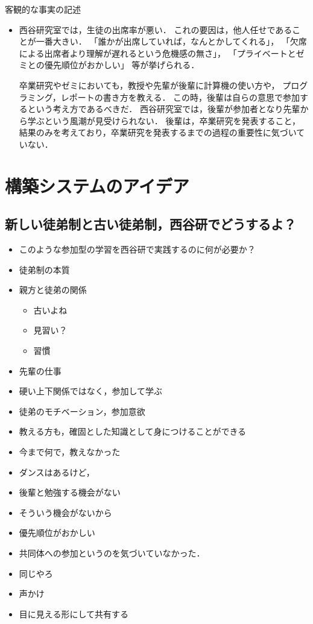 \documentclass{hissymp}
\begin{document}
客観的な事実の記述
\begin{itemize}
\item 西谷研究室では，生徒の出席率が悪い．
これの要因は，他人任せであることが一番大きい．
「誰かが出席していれば，なんとかしてくれる」，
「欠席による出席者より理解が遅れるという危機感の無さ」，
「プライベートとゼミとの優先順位がおかしい」
等が挙げられる．

卒業研究やゼミにおいても，教授や先輩が後輩に計算機の使い方や，
プログラミング，レポートの書き方を教える．
この時，後輩は自らの意思で参加するという考え方であるべきだ．
西谷研究室では，後輩が参加者となり先輩から学ぶという風潮が見受けられない．
後輩は，卒業研究を発表すること，
結果のみを考えており，卒業研究を発表するまでの過程の重要性に気づいていない．
\end{itemize}

\section{構築システムのアイデア}
\label{sec:org66e1738}
\subsection{新しい徒弟制と古い徒弟制，西谷研でどうするよ？}
\label{sec:orgd062f9d}
\begin{itemize}
\item このような参加型の学習を西谷研で実践するのに何が必要か？
\item 徒弟制の本質
\item 親方と徒弟の関係
\begin{itemize}
\item 古いよね
\item 見習い？
\item 習慣
\end{itemize}
\item 先輩の仕事
\item 硬い上下関係ではなく，参加して学ぶ
\item 徒弟のモチベーション，参加意欲
\item 教える方も，確固とした知識として身につけることができる
\item 今まで何で，教えなかった
\item ダンスはあるけど，
\item 後輩と勉強する機会がない
\item そういう機会がないから
\item 優先順位がおかしい
\item 共同体への参加というのを気づいていなかった．
\item 同じやろ
\item 声かけ
\item 目に見える形にして共有する
\end{itemize}
\end{document}
